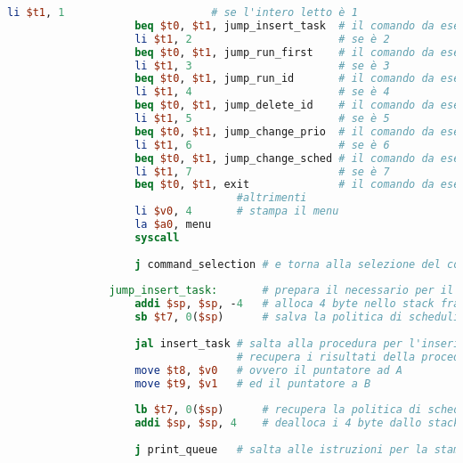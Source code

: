 \begin{center}
\begin{lstlisting}[language=mips, gobble=14, stepnumber=1]
                    li $t1, 1                       # se l'intero letto è 1
                    beq $t0, $t1, jump_insert_task  # il comando da eseguire è l'inserimento di un nuovo task
                    li $t1, 2                       # se è 2
                    beq $t0, $t1, jump_run_first    # il comando da eseguire è l'esecuzione del primo task
                    li $t1, 3                       # se è 3
                    beq $t0, $t1, jump_run_id       # il comando da eseguire è l'esecuzione di un task specifico
                    li $t1, 4                       # se è 4
                    beq $t0, $t1, jump_delete_id    # il comando da eseguire è l'eminazione di un task specifico
                    li $t1, 5                       # se è 5
                    beq $t0, $t1, jump_change_prio  # il comando da eseguire è la modifica della priorità di un task specifico
                    li $t1, 6                       # se è 6
                    beq $t0, $t1, jump_change_sched # il comando da eseguire è il cambio della politica di scheduling
                    li $t1, 7                       # se è 7
                    beq $t0, $t1, exit              # il comando da eseguire è la terminazione del programma
                                    #altrimenti
                    li $v0, 4       # stampa il menu
                    la $a0, menu
                    syscall
                    
                    j command_selection # e torna alla selezione del comando
                    
                jump_insert_task:       # prepara il necessario per il salto al comando d'inserimento
                    addi $sp, $sp, -4   # alloca 4 byte nello stack frame
                    sb $t7, 0($sp)      # salva la politica di scheduling nello stack
                    
                    jal insert_task # salta alla procedura per l'inserimento di un task
                                    # recupera i risultati della procedura
                    move $t8, $v0   # ovvero il puntatore ad A
                    move $t9, $v1   # ed il puntatore a B
                    
                    lb $t7, 0($sp)      # recupera la politica di scheduling dallo stack
                    addi $sp, $sp, 4    # dealloca i 4 byte dallo stack
                    
                    j print_queue   # salta alle istruzioni per la stampa della coda
                    

\end{lstlisting}
\end{center}
